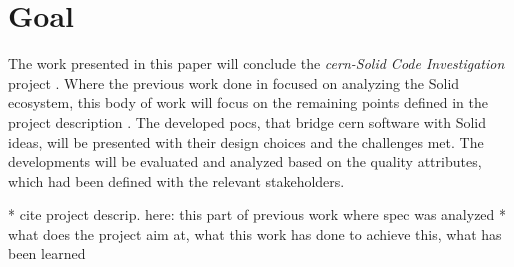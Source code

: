 \section{Goal}

The work presented in this paper will conclude the \textit{\gls{cern}-Solid Code Investigation} project \cite{cern-solid-code-investigation-project-description}. Where the previous work done in \cite{cern-solid-investigation-spec} focused on analyzing the Solid ecosystem, this body of work will focus on the remaining points defined in the project description \cite{cern-solid-code-investigation-project-description}. The developed \glspl{poc}, that bridge \gls{cern} software with Solid ideas, will be presented with their design choices and the challenges met. The developments will be evaluated and analyzed based on the quality attributes, which had been defined with the relevant stakeholders.


* cite project descrip. here: this part of previous work where spec was analyzed
* what does the project aim at, what this work has done to achieve this, what has been learned
